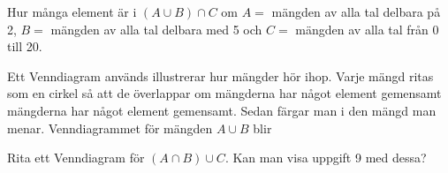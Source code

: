 \begin{problem}[Extra]
	Hur många element är i \((A \cup B) \cap C\) om \(A =\) mängden av alla tal delbara på 2, \(B = \) mängden av alla tal delbara med 5 och \(C =\) mängden av alla tal från 0 till 20.
\end{problem}

\begin{problem}[Extra]
	Ett Venndiagram används illustrerar hur mängder hör ihop. Varje mängd ritas som en cirkel så att de överlappar om mängderna har något element gemensamt mängderna har något element gemensamt. Sedan färgar man i den mängd man menar. Venndiagrammet för mängden \(A \cup B\) blir
	\def\firstcircle{(0,0) circle (1.5cm)}
	\def\secondcircle{(60:2cm) circle (1.5cm)}
	\def\thirdcircle{(0:2cm) circle (1.5cm)}
	\begin{center}
	\end{center}

	\noindent
	Rita ett Venndiagram för \((A \cap B)\cup C\). Kan man visa uppgift 9 med dessa?
\end{problem}

